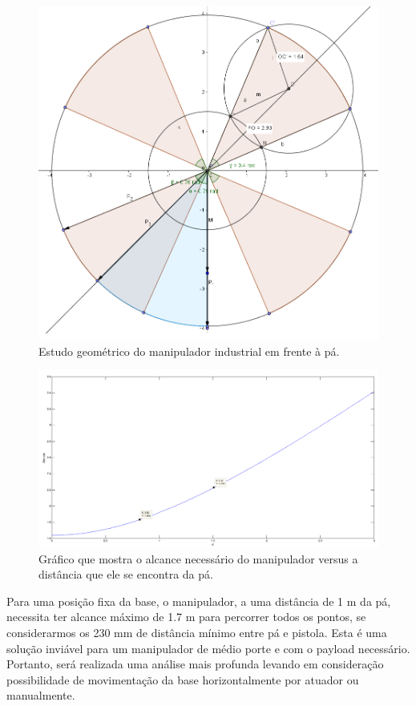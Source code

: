 \begin{figure}[h!]
\centering
	\includegraphics[width=\columnwidth]{figs/estudo/geometrico/paemfrente.png} 
	\caption{Estudo geométrico do manipulador industrial em frente à pá.}
	\label{paemfrente}
\end{figure}

\begin{figure}[h!]
\centering
	\includegraphics[width=\columnwidth]{figs/estudo/geometrico/reach.png} 
	\caption{Gráfico que mostra o alcance necessário do manipulador versus a
	distância que ele se encontra da pá.}
	\label{reach} 
\end{figure}

Para uma posição fixa da base, o manipulador, a uma distância de 1 m
da pá, necessita ter alcance máximo de 1.7 m para percorrer todos os pontos, se
considerarmos os 230 mm de distância mínimo entre pá e pistola. Esta é uma
solução inviável para um manipulador de médio porte e com o payload necessário.
Portanto, será realizada uma análise mais profunda levando em consideração
possibilidade de movimentação da base horizontalmente por atuador ou
manualmente.

